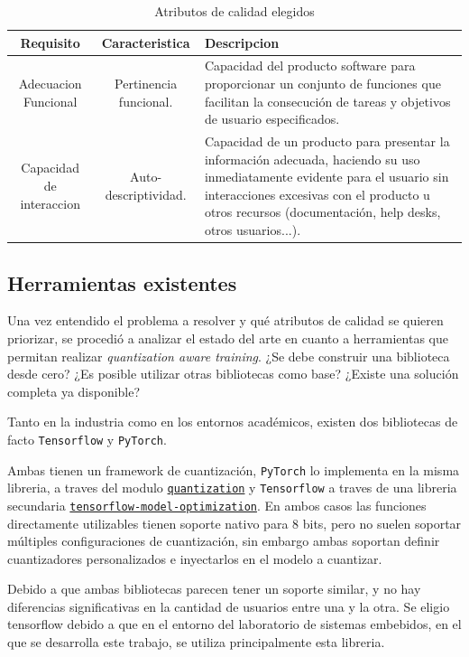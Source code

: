 \begin{table}[H]
\centering
\begin{tabular}{c c p{6cm}}
\toprule
\textbf{Requisito} & \textbf{Caracteristica} & \textbf{Descripcion} \\ \hline
Adecuacion Funcional & Pertinencia funcional. & Capacidad del producto software para proporcionar un conjunto de funciones que facilitan la consecución de tareas y objetivos de usuario especificados. \\ \hline
Capacidad de interaccion & Auto-descriptividad. & Capacidad de un producto para presentar la información adecuada, haciendo su uso inmediatamente evidente para el usuario sin interacciones excesivas con el producto u otros recursos (documentación, help desks, otros usuarios...). \\ \hline
\bottomrule
\end{tabular}
\caption{Atributos de calidad elegidos}
\label{tab:iso25010}
\end{table}

\subsection{Herramientas existentes}

Una vez entendido el problema a resolver y qué atributos de calidad se quieren priorizar, se procedió a analizar el estado del arte en cuanto a herramientas que permitan realizar \textit{quantization aware training}. ¿Se debe construir una biblioteca desde cero? ¿Es posible utilizar otras bibliotecas como base? ¿Existe una solución completa ya disponible?

Tanto en la industria como en los entornos académicos, existen dos bibliotecas de facto \texttt{Tensorflow} y \texttt{PyTorch}.

Ambas tienen un framework de cuantización, \texttt{PyTorch} lo implementa en la misma libreria, a traves del modulo \texttt{\href{https://docs.pytorch.org/docs/stable/quantization.html}{quantization}} y \texttt{Tensorflow} a traves de una libreria secundaria \texttt{\href{https://www.tensorflow.org/model_optimization}{tensorflow-model-optimization}}. En ambos casos las funciones directamente utilizables tienen soporte nativo para 8 bits, pero no suelen soportar múltiples configuraciones de cuantización, sin embargo ambas soportan definir cuantizadores personalizados e inyectarlos en el modelo a cuantizar.

Debido a que ambas bibliotecas parecen tener un soporte similar, y no hay diferencias significativas en la cantidad de usuarios entre una y la otra. Se eligio tensorflow debido a que en el entorno del laboratorio de sistemas embebidos, en el que se desarrolla este trabajo, se utiliza principalmente esta libreria.

